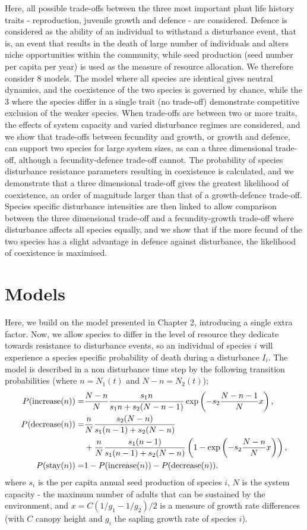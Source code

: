 \documentclass[preprint,10pt,reqno]{amsart}
\begin{document}
Here, all possible trade-offs between the three most important plant life history traits - reproduction, juvenile growth and defence - are considered. Defence is considered as the ability of an individual to withstand a disturbance event, that is, an event that results in the death of large number of individuals and alters niche opportunities within the community, while seed production (seed number per capita per year) is used as the measure of resource allocation. We therefore consider 8 models. The model where all species are identical gives neutral dynamics, and the coexistence of the two species is governed by chance, while the 3 where the species differ in a single trait (no trade-off) demonstrate competitive exclusion of the weaker species. When trade-offs are between two or more traits, the effects of system capacity and varied disturbance regimes  are considered, and we show that trade-offs between fecundity and growth, or growth and defence, can support two species for large system sizes, as can a three dimensional trade-off, although a fecundity-defence trade-off cannot. The probability of species disturbance resistance parameters resulting in coexistence is calculated, and we demonstrate that a three dimensional trade-off gives the greatest likelihood of coexistence, an order of magnitude larger than that of a growth-defence trade-off. Species specific disturbance intensities are then linked to allow comparison between the three dimensional trade-off and a fecundity-growth trade-off where disturbance affects all species equally, and we show that if the more fecund of the two species has a slight advantage in defence against disturbance, the likelihood of coexistence is maximised.


\section{Models}
Here, we build on the model presented in Chapter 2, introducing a single extra factor. Now, we allow species to differ in the level of resource they dedicate towards resistance to disturbance events, so an individual of species $i$ will experience a species specific probability of death during a disturbance $I_i$. The model is described in a non disturbance time  step by the following transition probabilities (where $n=N_1(t)$ and $N-n=N_2(t)$);
\begin{align}
\label{inc}P(\text{increase}(n))=&\frac{N-n}{N}\frac{s_1 n}{s_1 n +s_2(N-n-1)}\exp \left( -s_2 \frac{N-n-1}{N} x\right),\\
\label{dec}P(\text{decrease}(n))=&\frac{n}{N}\frac{s_2 (N-n)}{s_1 (n-1) +s_2(N-n)}  \\
& + \frac{n}{N}\frac{s_1 (n-1)}{s_1 (n-1) +s_2(N-n)}\left(1-\exp \left( -s_2 \frac{N-n}{N} x\right)\right), \notag \\
\label{stay}P(\text{stay}(n))=&1-P(\text{increase}(n))-P(\text{decrease}(n)).
\end{align}
where $s_i$ is the per capita annual seed production of species $i$, $N$ is the system capacity - the maximum number of adults that can be sustained by the environment, and $x=C(1/g_1 - 1/g_2)/2$ is a measure of growth rate differences (with $C$ canopy height and $g_i$ the sapling growth rate of species $i$).
\end{document}
